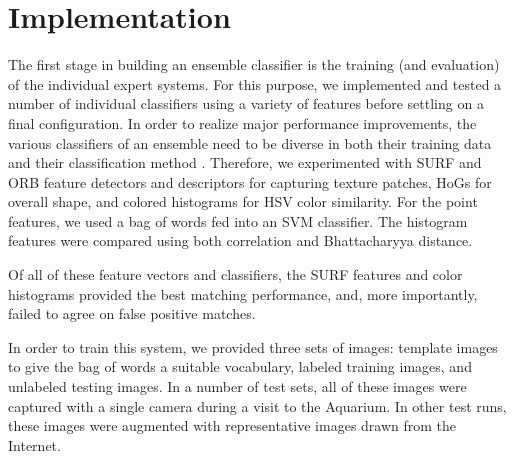 \documentclass[10pt,twocolumn,letterpaper]{article}
\begin{document}
\section{Implementation}
  The first stage in building an ensemble classifier is the training (and evaluation) of the individual expert systems. For this purpose, we implemented and tested a number of individual classifiers using a variety of features before settling on a final configuration. In order to realize major performance improvements, the various classifiers of an ensemble need to be diverse in both their training data and their classification method \cite{rokach2010ensemble}. Therefore, we experimented with SURF \cite{bay2006surf} and ORB \cite{rublee2011orb} feature detectors and descriptors for capturing texture patches, HoGs \cite{dalal2005histograms} for overall shape, and colored histograms \cite{stricker1995similarity} for HSV color similarity. For the point features, we used a bag of words \cite{csurka2004visual} fed into an SVM classifier. The histogram features were compared using both correlation and Bhattacharyya \cite{bhattacharyya1943distance} distance.
  
  Of all of these feature vectors and classifiers, the SURF features and color histograms provided the best matching performance, and, more importantly, failed to agree on false positive matches. 
  
  In order to train this system, we provided three sets of images: template images to give the bag of words a suitable vocabulary, labeled training images, and unlabeled testing images. In a number of test sets, all of these images were captured with a single camera during a visit to the Aquarium. In other test runs, these images were augmented with representative images drawn from the Internet.
  
\end{document}
